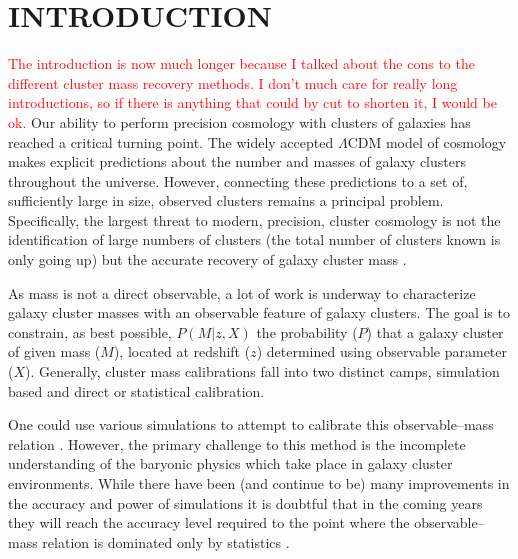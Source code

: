 \documentclass[fleqn,usenatbib]{mnras}
\newcommand{\editorial}[1]{\textcolor{red}{#1}}
\begin{document}
\section{INTRODUCTION}
\editorial{The introduction is now much longer because I talked about the cons to the different cluster mass recovery methods. I don't much care for really long introductions, so if there is anything that could by cut to shorten it, I would be ok.}
Our ability to perform precision cosmology with clusters of galaxies has reached a critical turning point. The widely accepted $\Lambda$CDM model of cosmology makes explicit predictions about the number and masses of galaxy clusters throughout the universe. However, connecting these predictions to a set of, sufficiently large in size, observed clusters remains a principal problem. Specifically, the largest threat to modern, precision, cluster cosmology is not the identification of large numbers of clusters (the total number of clusters known is only going up) but the accurate recovery of galaxy cluster mass .

As mass is not a direct observable, a lot of work is underway to characterize galaxy cluster masses with an observable feature of galaxy clusters. The goal is to constrain, as best possible, $P(M|z, X)$ the probability ($P$) that a galaxy cluster of given mass ($M$), located at redshift ($z$) determined using observable parameter ($X$). Generally, cluster mass calibrations fall into two distinct camps, simulation based and direct or statistical calibration.

One could use various simulations to attempt to calibrate this observable--mass relation . However, the primary challenge to this method is the incomplete understanding of the baryonic physics which take place in galaxy cluster environments. While there have been (and continue to be) many improvements in the accuracy and power of simulations it is doubtful that in the coming years they will reach the accuracy level required to the point where the observable--mass relation is dominated only by statistics \citep{Weinberg2013}. 
 
\end{document}
